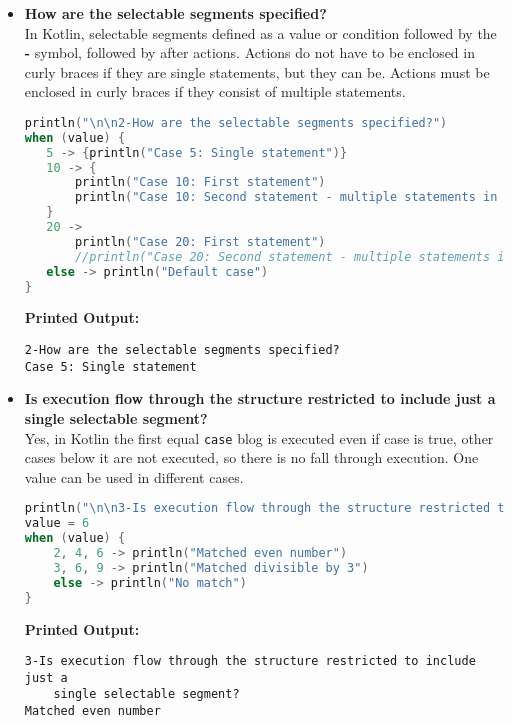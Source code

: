 \documentclass{article}
\begin{document}
\begin{itemize}
\item \textbf{How are the selectable segments specified?} \\
In Kotlin, selectable segments defined as a value or condition followed by the \textbf{-\>} symbol, followed by after actions. Actions do not have to be enclosed in curly braces if they are single statements, but they can be. Actions must be enclosed in curly braces if they consist of multiple statements.
\begin{lstlisting}[language=Kotlin]
println("\n\n2-How are the selectable segments specified?")
when (value) {
   5 -> {println("Case 5: Single statement")}
   10 -> {
       println("Case 10: First statement")
       println("Case 10: Second statement - multiple statements in a block")
   }
   20 -> 
       println("Case 20: First statement")
       //println("Case 20: Second statement - multiple statements in a block")
   else -> println("Default case")
}
\end{lstlisting}
\textbf{Printed Output:} 
\begin{verbatim}
2-How are the selectable segments specified?
Case 5: Single statement
\end{verbatim}




\item \textbf{Is execution flow through the structure restricted to include just a single selectable segment?} \\
Yes, in Kotlin the first equal \texttt{case} blog is executed even if case is true, other cases below it are not executed, so there is no fall through execution. One value can be used in different cases.
\begin{lstlisting}[language=Kotlin]
println("\n\n3-Is execution flow through the structure restricted to include just a single selectable segment?")  
value = 6
when (value) {
    2, 4, 6 -> println("Matched even number")
    3, 6, 9 -> println("Matched divisible by 3")
    else -> println("No match")
}
\end{lstlisting}
\textbf{Printed Output:} 
\begin{verbatim}
3-Is execution flow through the structure restricted to include just a
    single selectable segment?
Matched even number
\end{verbatim}




\end{itemize}
\end{document}
